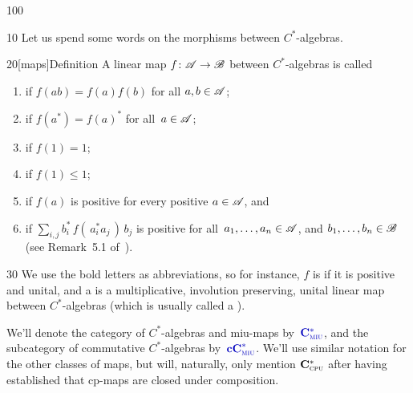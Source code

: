 \begin{parsec}{100}%
\begin{point}{10}%
Let us spend some words
on the morphisms between $C^*$-algebras.
\end{point}
\begin{point}{20}[maps]{Definition}
A linear map $f\colon \mathscr{A} \to \mathscr{B}$
between $C^*$-algebras
is called
\begin{enumerate}
\item
{}%
if $f(ab)=f(a)f(b)$ for all $a,b\in\mathscr{A}$;
\item
{}%
if $f(a^*)=f(a)^*$ for all~$a\in\mathscr{A}$;
\item
{}%
if $f(1)=1$;
\item
{}%
if $f(1)\leq 1$;
\item
{}%
if $f(a)$ is positive
for every positive $a\in\mathscr{A}$, and
\item
{}%
%
if $\sum_{i,j} b_i^*\,f(\,a_i^*a_j\,)\,b_j$ is positive
for all~$a_1,\dotsc,a_n\in \mathscr{A}$, and $b_1,\dotsc,b_n\in\mathscr{B}$
(see Remark~5.1 of~\cite{paschke}).
\end{enumerate}
\begin{point}{30}%
We use the bold letters as abbreviations,
so for instance,
$f$ is %
 if it is positive and unital,
and a %
is a multiplicative, involution preserving,
unital linear map between $C^*$-algebras
(which is usually called a %
).

We'll denote the category of $C^*$-algebras
and miu-maps by~$\Define{\Cstar{miu}}$,%
and
the subcategory of commutative $C^*$-algebras
by~$\Define{\cCstar{miu}}$.%
We'll use similar notation
for the other classes of maps,
but
will,
naturally, only mention $\mathbf{C}^*_{\text{\textsc{cpu}}}$
after having established that cp-maps are closed under composition.


\end{point}
\end{point}
\end{parsec}
